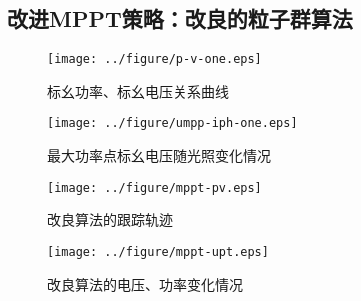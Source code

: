 \documentclass[a4paper,12pt]{article}
\begin{document}
    \subsection{改进MPPT策略：改良的粒子群算法} %
    \label{sub:改进mppt策略_改良的粒子群算法}
    \begin{figure}[htbp]
        \centering
        \texttt{[image: ../figure/p-v-one.eps]}
        \caption{标幺功率、标幺电压关系曲线}
        \label{fig:p-v-one}
    \end{figure}
    \begin{figure}[htbp]
        \centering
        \texttt{[image: ../figure/umpp-iph-one.eps]}
        \caption{最大功率点标幺电压随光照变化情况}
        \label{fig:umpp-iph-one}
    \end{figure}
    \begin{figure}[htbp]
        \centering
        \texttt{[image: ../figure/mppt-pv.eps]}
        \caption{改良算法的跟踪轨迹}
        \label{fig:mppt-pv}
    \end{figure}
    \begin{figure}[htbp]
        \centering
        \texttt{[image: ../figure/mppt-upt.eps]}
        \caption{改良算法的电压、功率变化情况}
        \label{fig:mppt-upt}
    \end{figure}
\iffalse
\begin{itemize}[noitemsep,topsep=0pt]
\end{itemize}
\begin{enumerate}[label=\Roman{*}.,noitemsep,topsep=0pt]
\end{enumerate}
\begin{multicols}{2}
\end{multicols}
\fi
\end{document}
